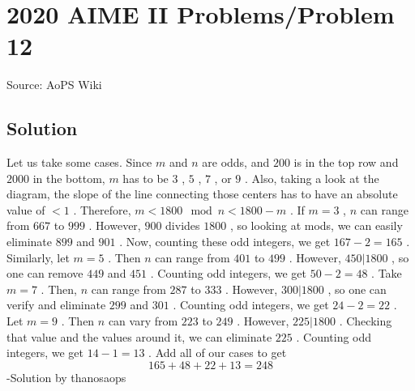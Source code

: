 \documentclass[12pt]{article}
\begin{document}
\section*{{2020 AIME II Problems/Problem 12}}
Source: AoPS Wiki

\subsection*{Solution}
Let us take some cases. Since $m$ and $n$ are odds, and $200$ is in the top row and $2000$ in the bottom, $m$ has to be $3$ , $5$ , $7$ , or $9$ . Also, taking a look at the diagram, the slope of the line connecting those centers has to have an absolute value of $< 1$ . Therefore, $m < 1800 \mod n < 1800-m$ . If $m=3$ , $n$ can range from $667$ to $999$ . However, $900$ divides $1800$ , so looking at mods, we can easily eliminate $899$ and $901$ . Now, counting these odd integers, we get $167 - 2 = 165$ . Similarly, let $m=5$ . Then $n$ can range from $401$ to $499$ . However, $450|1800$ , so one can remove $449$ and $451$ . Counting odd integers, we get $50 - 2 = 48$ . Take $m=7$ . Then, $n$ can range from $287$ to $333$ . However, $300|1800$ , so one can verify and eliminate $299$ and $301$ . Counting odd integers, we get $24 - 2 = 22$ . Let $m = 9$ . Then $n$ can vary from $223$ to $249$ . However, $225|1800$ . Checking that value and the values around it, we can eliminate $225$ . Counting odd integers, we get $14 - 1 = 13$ . Add all of our cases to get \[165+48+22+13 = \boxed{248}\] -Solution by thanosaops
\end{document}
